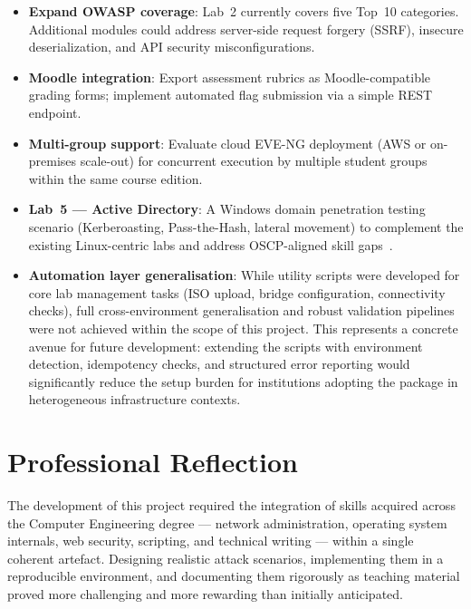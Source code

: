 \begin{itemize}
    \item \textbf{Expand OWASP coverage}: Lab~2 currently covers five Top~10
          categories. Additional modules could address server-side request forgery
          (SSRF), insecure deserialization, and API security misconfigurations.

    \item \textbf{Moodle integration}: Export assessment rubrics as Moodle-compatible
          grading forms; implement automated flag submission via a simple REST endpoint.

    \item \textbf{Multi-group support}: Evaluate cloud EVE-NG deployment (AWS or
          on-premises scale-out) for concurrent execution by multiple student groups
          within the same course edition.

    \item \textbf{Lab~5 --- Active Directory}: A Windows domain penetration testing
          scenario (Kerberoasting, Pass-the-Hash, lateral movement) to complement
          the existing Linux-centric labs and address OSCP-aligned skill gaps~\cite{oscp_exam}.

    \item \textbf{Automation layer generalisation}: While utility scripts were
          developed for core lab management tasks (ISO upload, bridge configuration,
          connectivity checks), full cross-environment generalisation and robust
          validation pipelines were not achieved within the scope of this project.
          This represents a concrete avenue for future development: extending the
          scripts with environment detection, idempotency checks, and structured
          error reporting would significantly reduce the setup burden for institutions
          adopting the package in heterogeneous infrastructure contexts.
\end{itemize}

\section{Professional Reflection}

The development of this project required the integration of skills acquired
across the Computer Engineering degree --- network administration, operating
system internals, web security, scripting, and technical writing --- within a
single coherent artefact. Designing realistic attack scenarios, implementing
them in a reproducible environment, and documenting them rigorously as teaching
material proved more challenging and more rewarding than initially anticipated.

